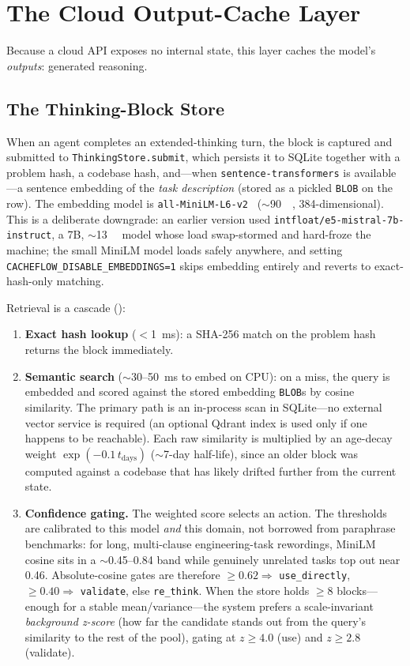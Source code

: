\documentclass[10pt]{article}
\begin{document}
\section{The Cloud Output-Cache Layer}
\label{sec:cloud}

Because a cloud API exposes no internal state, this layer caches the model's
\emph{outputs}: generated reasoning.

\subsection{The Thinking-Block Store}
\label{sec:thinking}
When an agent completes an extended-thinking turn, the block is captured and
submitted to \texttt{ThinkingStore.submit}, which persists it to SQLite together
with a problem hash, a codebase hash, and---when
\texttt{sentence-transformers} is available---a sentence embedding of the
\emph{task description} (stored as a pickled \texttt{BLOB} on the row).
The embedding model is \texttt{all-MiniLM-L6-v2}~\cite{minilm}
($\sim$\SI{90}{\mega\byte}, 384-dimensional). This is a deliberate downgrade: an
earlier version used \texttt{intfloat/e5-mistral-7b-instruct}, a 7B,
$\sim$\SI{13}{\giga\byte} model whose load swap-stormed and hard-froze the
machine; the small MiniLM model loads safely anywhere, and setting
\texttt{CACHEFLOW\_DISABLE\_EMBEDDINGS=1} skips embedding entirely and reverts to
exact-hash-only matching.

Retrieval is a cascade ():
\begin{enumerate}
  \item \textbf{Exact hash lookup} ($<$\SI{1}{\milli\second}): a SHA-256 match
  on the problem hash returns the block immediately.
  \item \textbf{Semantic search} ($\sim$\SI{30}{}--\SI{50}{\milli\second} to
  embed on CPU): on a miss, the query is embedded and scored against the stored
  embedding \texttt{BLOB}s by cosine similarity. The primary path is an
  in-process scan in SQLite---no external vector service is required (an
  optional Qdrant index is used only if one happens to be reachable). Each raw
  similarity is multiplied by an age-decay weight $\exp(-0.1\,t_{\text{days}})$
  ($\sim$7-day half-life), since an older block was computed against a codebase
  that has likely drifted further from the current state.
  \item \textbf{Confidence gating.} The weighted score selects an action. The
  thresholds are calibrated to this model \emph{and} this domain, not borrowed
  from paraphrase benchmarks: for long, multi-clause engineering-task
  rewordings, MiniLM cosine sits in a $\sim$0.45--0.84 band while genuinely
  unrelated tasks top out near 0.46. Absolute-cosine gates are therefore
  $\ge\!0.62 \Rightarrow$ \texttt{use\_directly}, $\ge\!0.40 \Rightarrow$
  \texttt{validate}, else \texttt{re\_think}. When the store holds
  $\ge\!8$ blocks---enough for a stable mean/variance---the system prefers a
  scale-invariant \emph{background z-score} (how far the candidate stands out
  from the query's similarity to the rest of the pool), gating at $z\ge4.0$
  (use) and $z\ge2.8$ (validate).
\end{enumerate}
\end{document}
